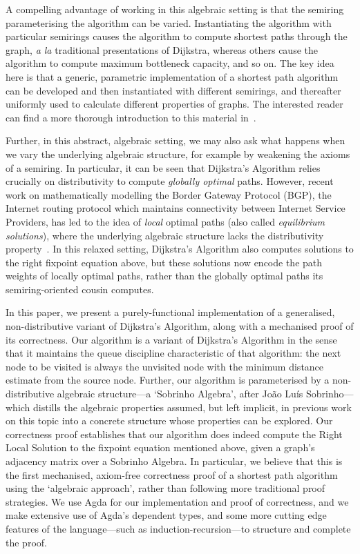 A compelling advantage of working in this algebraic setting is that the semiring parameterising the algorithm can be varied.
Instantiating the algorithm with particular semirings causes the algorithm to compute shortest paths through the graph, \emph{a la} traditional presentations of Dijkstra, whereas others cause the algorithm to compute maximum bottleneck capacity, and so on.
The key idea here is that a generic, parametric implementation of a shortest path algorithm can be developed and then instantiated with different semirings, and thereafter uniformly used to calculate different properties of graphs.
The interested reader can find a more thorough introduction to this material in~\cite{gondran_graphs_2008}.

Further, in this abstract, algebraic setting, we may also ask what happens when we vary the underlying algebraic structure, for example by weakening the axioms of a semiring.
In particular, it can be seen that Dijkstra's Algorithm relies crucially on distributivity to compute \emph{globally optimal} paths.
However, recent work on mathematically modelling the Border Gateway Protocol (BGP), the Internet routing protocol which maintains connectivity between Internet Service Providers, has led to the idea of \emph{local} optimal paths (also called \emph{equilibrium solutions}), where the underlying algebraic structure lacks the distributivity property~\cite{sobrinho_routing_2010}.
In this relaxed setting, Dijkstra's Algorithm also computes solutions to the right fixpoint equation above, but these solutions now encode the path weights of locally optimal paths, rather than the globally optimal paths its semiring-oriented cousin computes.

In this paper, we present a purely-functional implementation of a generalised, non-distributive variant of Dijkstra's Algorithm, along with a mechanised proof of its correctness.
Our algorithm is a variant of Dijkstra's Algorithm in the sense that it maintains the queue discipline characteristic of that algorithm: the next node to be visited is always the unvisited node with the minimum distance estimate from the source node.
Further, our algorithm is parameterised by a non-distributive algebraic structure---a `Sobrinho Algebra', after Jo\~ao Lu\'is Sobrinho---which distills the algebraic properties assumed, but left implicit, in previous work on this topic into a concrete structure whose properties can be explored.
Our correctness proof establishes that our algorithm does indeed compute the Right Local Solution to the fixpoint equation mentioned above, given a graph's adjacency matrix over a Sobrinho Algebra.
In particular, we believe that this is the first mechanised, axiom-free correctness proof of a shortest path algorithm using the `algebraic approach', rather than following more traditional proof strategies.
We use Agda for our implementation and proof of correctness, and we make extensive use of Agda's dependent types, and some more cutting edge features of the language---such as induction-recursion---to structure and complete the proof.

